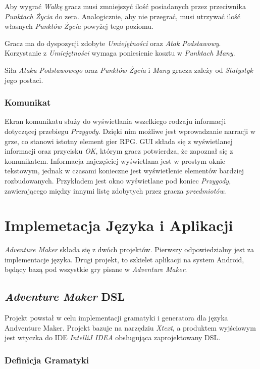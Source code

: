 \documentclass[openright]{xmgr}
\begin{document}
Aby wygrać \textit{Walkę} gracz musi zmniejszyć ilość posiadanych przez przeciwnika \textit{Punktach Życia} do zera. Analogicznie, aby nie przegrać, musi utrzywać ilość własnych \textit{Punktów Życia}
powyżej tego poziomu.

Gracz ma do dyspozycji zdobyte \textit{Umiejętności} oraz \textit{Atak Podstawowy}. Korzystanie z \textit{Umiejętności} wymaga poniesienie kosztu w \textit{Punktach Many}.

Siła \textit{Ataku Podstawowego} oraz \textit{Punktów Życia} i \textit{Many} gracza zależy od \textit{Statystyk} jego postaci.

\subsection*{Komunikat}

Ekran komunikatu służy do wyświetlania wszelkiego rodzaju informacji dotyczącej przebiegu \textit{Przygody}. Dzięki nim możliwe jest wprowadzanie narracji w grze, co stanowi istotny element gier RPG. GUI składa się z wyświetlanej informacji oraz przycisku \textit{OK}, którym gracz potwierdza, że zapoznał się z komunikatem. Informacja najczęściej wyświetlana jest w prostym oknie tekstowym, jednak w czasami konieczne jest wyświetlenie elementów bardziej rozbudowanych. Przykładem jest okno wyświetlane pod koniec \textit{Przygody}, zawierającego między innymi listę zdobytych przez gracza \textit{przedmiotów}.

\chapter{Implemetacja Języka i Aplikacji}

\textit{Adventure Maker} składa się z dwóch projektów. Pierwszy odpowiedzialny jest za implementacje języka. Drugi projekt, to szkielet aplikacji na system Android, będący bazą pod wszystkie gry pisane w \textit{Adventure Maker}. 

\section{\textit{Adventure Maker} DSL} 
Projekt powstał w celu implementacji gramatyki i generatora dla języka Andventure Maker. Projekt bazuje na narzędziu \textit{Xtext}\cite{Xtext:2017:Doc}, a produktem wyjściowym jest wtyczka do IDE \textit{IntelliJ IDEA} obsługująca zaprojektowany DSL. 

\subsection{Definicja Gramatyki} 
\end{document}
